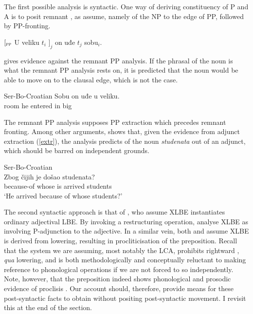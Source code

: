 \documentclass[output=paper]{langsci/langscibook}
\begin{document}
The first possible analysis is syntactic. One way of deriving
con\-sti\-tu\-en\-cy of P and A is to posit remnant , as
\citet{FranksProgovac:1994} assume, namely  of the NP to the edge
of PP, followed by PP-fronting.

\begin{exe}
	\ex $[_{\textsc{pp}}$ U veliku $t_i$ $]_j$ on uđe $t_j$ sobu$_i$.
    \hfill\citep[30, n.\ 79]{Boskovic:2005}
\end{exe}

\citet{Boskovic:2005} gives evidence against the remnant PP analysis. If the
phrasal  of the noun is what the remnant PP analysis rests on, it
is predicted that the noun would be able to move on to the clausal edge, which
is not the case.

\begin{exe}
    \ex Ser-Bo-Croatian
    \gll \llap{*}Sobu on uđe u veliku. \\
	room he entered in big \\
	\trans
\label{np-bad}
\end{exe}

The remnant PP analysis supposes PP extraction which precedes remnant fronting.
Among other arguments, \citet{Boskovic:2005} shows that, given the evidence
from adjunct extraction (\ref{extr}), the analysis predicts  of
the noun \emph{studenata} out of an adjunct, which should be barred on
independent grounds.

\begin{exe}
    \ex Ser-Bo-Croatian \parencite[32]{Boskovic:2005}\\
	\gll Zbog čijih je došao studenata? \\
	because-of whose is arrived students \\
	\trans `He arrived because of whose students?'\label{extr}
\end{exe}

The second syntactic approach is that of \citet{BorselyJaworska:1988}, who
assume XLBE instantiates ordinary adjectival \gls{LBE}. By invoking a restructuring operation,
\citet{BorselyJaworska:1988} analyse XLBE as involving
P-adjunction to the adjective. In a similar vein, both
\citet{Corver:1992} and \citet{FranksProgovac:1994} assume XLBE is derived from
lowering, resulting in procliticisation of the preposition. Recall that the
system we are assuming, most notably the \gls{LCA}, prohibits rightward , \emph{qua} lowering, and is both
methodologically and conceptually reluctant to making reference to phonological
operations if we are not forced to so independently. Note, however, that the
preposition indeed shows phonological and prosodic evidence of proclisis
\citep{Talic:2013,Talic:2015}. Our account should, therefore, provide means for
these post-syntactic facts to obtain without positing post-syntactic movement.
I revisit this at the end of the section.
\end{document}
